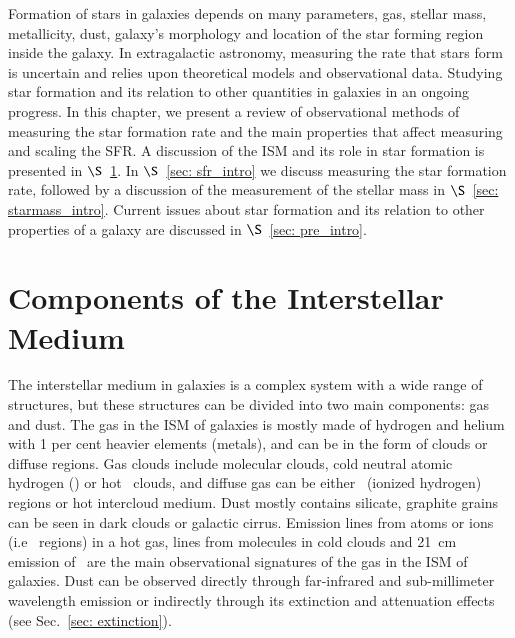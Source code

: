 Formation of stars in galaxies depends on many parameters, gas, stellar mass, metallicity, dust, galaxy's morphology and location of the star forming region inside the galaxy.
In extragalactic astronomy, measuring the rate that stars form is uncertain and relies upon theoretical models and observational data.
Studying star formation and its relation to other quantities in galaxies in an ongoing progress.
In this chapter, we present a review of observational methods of measuring the star formation rate and the main properties that affect measuring and scaling the SFR. A discussion of the ISM and its role in star formation is presented in $\S$~\ref{sec: ism_intro}. In $\S$~\ref{sec: sfr_intro} we discuss measuring the star formation rate, followed by a discussion of the measurement of the stellar mass in $\S$~\ref{sec: starmass_intro}. Current issues about star formation and its relation to other properties of a galaxy are discussed in $\S$~\ref{sec: pre_intro}. 





\section{Components of the Interstellar Medium} 
\label{sec: ism_intro}
The interstellar medium in galaxies is a complex system with a wide range of structures, but these structures can be divided into two main components: gas and dust.
The gas in the ISM of galaxies is mostly made of hydrogen and helium with 1 per cent heavier elements (metals), and can be in the form of clouds or diffuse regions.
Gas clouds include molecular clouds, cold neutral atomic hydrogen (\hi) or hot \hi~clouds, and diffuse gas can be either \hii~(ionized hydrogen) regions or hot intercloud medium.
Dust mostly contains silicate, graphite grains can be seen in dark clouds or galactic cirrus.
Emission lines from atoms or ions (i.e \hii~regions) in a hot gas, lines from molecules in cold clouds and 21~cm emission of \hi~are the main observational signatures of the gas in the ISM of galaxies.
Dust can be observed directly through far-infrared and sub-millimeter wavelength emission or indirectly through its extinction and attenuation effects (see Sec.~\ref{sec: extinction}).

